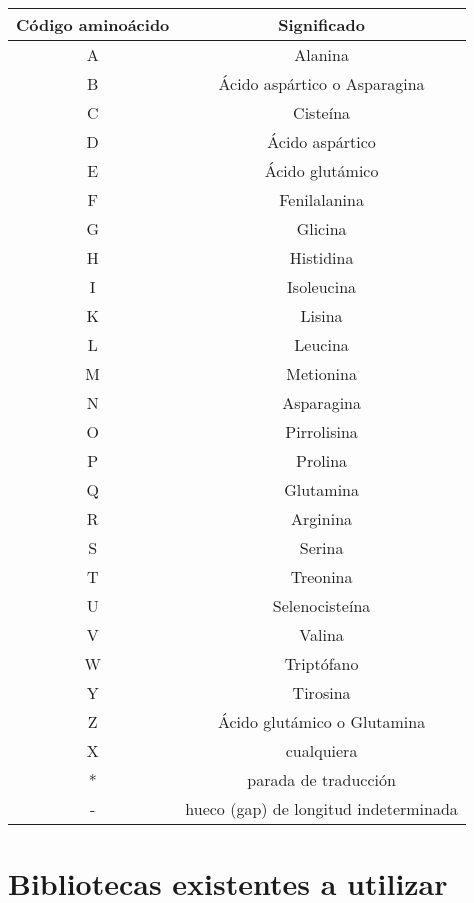 \documentclass[12pt,a4paper,spanish]{article}
\begin{document}
\begin{itemize}
					\begin{center}
						\begin{tabular}{| c | c |}
							\hline
							{\bf Código aminoácido} & {\bf Significado} \\
							\hline
							\hline		
							A &	Alanina \\\hline
							B & Ácido aspártico o Asparagina \\\hline
							C &	Cisteína \\\hline
							D &	Ácido aspártico \\\hline
							E &	Ácido glutámico \\\hline
							F &	Fenilalanina \\\hline
							G &	Glicina \\\hline
							H &	Histidina \\\hline
							I & Isoleucina \\\hline
							K &	Lisina \\\hline
							L &	Leucina \\\hline
							M & Metionina \\\hline
							N &	Asparagina \\\hline
							O &	Pirrolisina \\\hline
							P &	Prolina \\\hline
							Q &	Glutamina \\\hline
							R &	Arginina \\\hline
							S &	Serina \\\hline
							T &	Treonina \\\hline
							U &	Selenocisteína \\\hline
							V &	Valina \\\hline
							W &	Triptófano \\\hline
							Y &	Tirosina \\\hline
							Z &	Ácido glutámico o Glutamina \\\hline
							X &	cualquiera \\\hline
							* &	parada de traducción \\\hline
							- &	hueco (gap) de longitud indeterminada \\\hline
						\end{tabular}
					\end{center}	
			 \end{itemize}

		
		
\section{Bibliotecas existentes a utilizar}	
\end{document}
